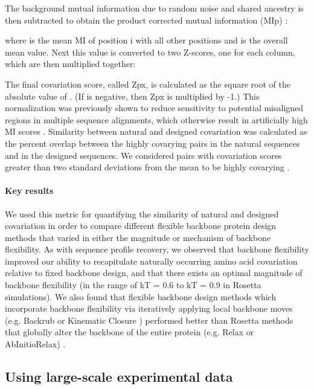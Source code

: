 The background mutual information due to random noise and shared ancestry is then subtracted to obtain the product corrected mutual information (MIp) \cite{dunn_mutual_2008}:



where  is the mean MI of position i with all other positions and  is the overall mean value. Next this value is converted to two Z-scores, one for each column, which are then multiplied together:


The final covariation score, called Zpx, is calculated as the square root of the absolute value of . (If  is negative, then Zpx is multiplied by -1.) This normalization was previously shown to reduce sensitivity to potential misaligned regions in multiple sequence alignments, which otherwise result in artificially high MI scores \cite{dickson_identifying_2010}. Similarity between natural and designed covariation was calculated as the percent overlap between the highly covarying pairs in the natural sequences and in the designed sequences. We considered pairs with covariation scores greater than two standard deviations from the mean to be highly covarying \cite{ollikainen_computational_2013}.

\paragraph{Key results}

We used this metric for quantifying the similarity of natural and designed covariation in order to compare different flexible backbone protein design methods that varied in either the magnitude or mechanism of backbone flexibility. As with sequence profile recovery, we observed that backbone flexibility improved our ability to recapitulate naturally occurring amino acid covariation relative to fixed backbone design, and that there exists an optimal magnitude of backbone flexibility (in the range of kT = 0.6 to kT = 0.9 in Rosetta simulations). We also found that flexible backbone design methods which incorporate backbone flexibility via iteratively applying local backbone moves (e.g. Backrub \cite{smith_backrub-like_2008} or Kinematic Closure \cite{mandell_sub-angstrom_2009}) performed better than Rosetta methods that globally alter the backbone of the entire protein (e.g. Relax or AbInitioRelax) \cite{ollikainen_computational_2013}.

\subsection{Using large-scale experimental data}

